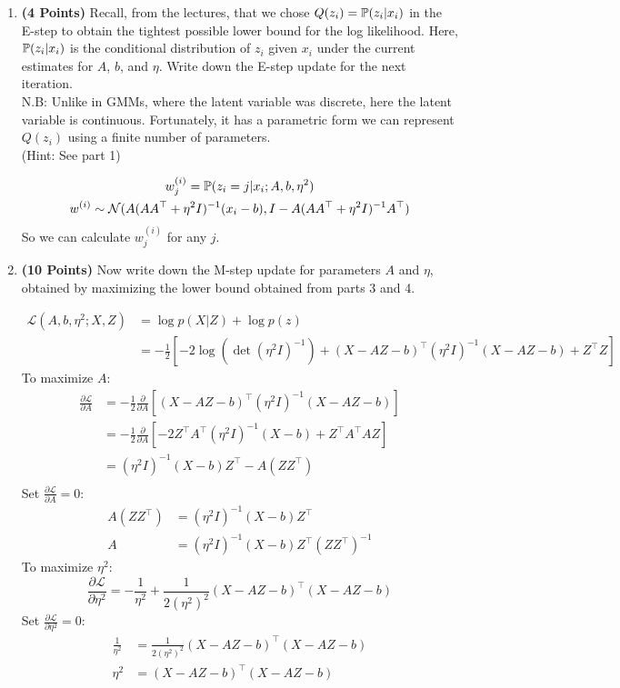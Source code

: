 \begin{enumerate}
\item \textbf{(4 Points)}
Recall, from the lectures, that we chose
$Q(z_i) =  \mathbb{P}(z_i|x_i)$ in the E-step to obtain the tightest
possible lower bound for the log likelihood.
Here, $ \mathbb{P}(z_i|x_i)$ is the conditional distribution of $z_i$
given $x_i$ under the current estimates for $A$, $b$, and $\eta$.
Write down the E-step update for the next iteration. \\
N.B: Unlike in GMMs, where the latent variable was discrete, here the latent variable is continuous. Fortunately, it has a parametric form we can represent $Q(z_i)$ using a finite number of parameters. \\
(Hint: See part 1)

\begin{soln}
  \begin{gather*}
    w^{(i)}_j = \mathbb{P}(z_i = j \vert x_i; A, b, \eta^2) \\
    w^{(i)} \sim \mathcal{N}(A(AA^\top + \eta^2 I)^{-1}(x_i-b), I - A(AA^\top + \eta^2 I)^{-1}A^\top)
  \end{gather*}
  So we can calculate $w^{(i)}_j$ for any $j$.
\end{soln}

\item \textbf{(10 Points)}
Now write down the M-step update for parameters $A$ and $\eta$, obtained
by maximizing the lower bound obtained from parts 3 and 4.

\begin{soln}
  $$
  \begin{aligned}
    \mathcal{L}(A, b, \eta^2; X, Z) & = \log p(X \vert Z) + \log p(z) \\
    & = -\frac{1}{2} \left[-2\log(\det(\eta^2 I)^{-1}) + (X-AZ-b)^\top (\eta^2 I)^{-1} (X-AZ-b)+Z^\top Z\right]
  \end{aligned}
  $$
  To maximize $A$:
  $$
  \begin{aligned}
    \frac{\partial \mathcal{L}}{\partial A} & = -\frac{1}{2} \frac{\partial}{\partial A} \left[(X-AZ-b)^\top (\eta^2 I)^{-1} (X-AZ-b)\right] \\
    & = -\frac{1}{2} \frac{\partial}{\partial A} \left[-2 Z^\top A^\top (\eta^2 I)^{-1}(X-b) + Z^\top A^\top AZ \right] \\
    & = (\eta^2 I)^{-1}(X-b)Z^\top - A(ZZ^\top) \\
  \end{aligned}
  $$
  Set $\frac{\partial \mathcal{L}}{\partial A} = 0$:
  $$
  \begin{aligned}
    A(ZZ^\top) & = (\eta^2 I)^{-1}(X-b)Z^\top \\
    A & = (\eta^2 I)^{-1}(X-b)Z^\top (ZZ^\top)^{-1}
  \end{aligned}
  $$
  To maximize $\eta^2$:
  $$\frac{\partial \mathcal{L}}{\partial \eta^2} = -\frac{1}{\eta^2} + \frac{1}{2 (\eta^2)^2}(X-AZ-b)^\top(X-AZ-b)$$
  Set $\frac{\partial \mathcal{L}}{\partial \eta^2} = 0$:
  $$
  \begin{aligned}
    \frac{1}{\eta^2} & = \frac{1}{2 (\eta^2)^2}(X-AZ-b)^\top(X-AZ-b) \\
    \eta^2 & = (X-AZ-b)^\top(X-AZ-b)
  \end{aligned}
  $$
\end{soln}


\end{enumerate}
